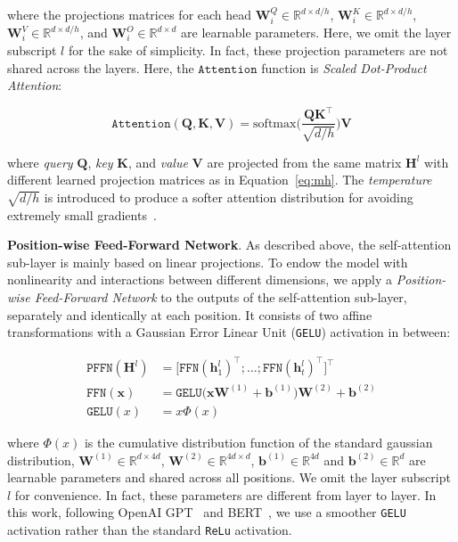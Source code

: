  
where the projections matrices for each head $\bm{W}_i^Q \in \mathbb{R}^{d \times d/h}$, $\bm{W}_i^K \in \mathbb{R}^{d \times d/h}$, $\bm{W}_i^V \in \mathbb{R}^{d \times d/h}$, and $\bm{W}_i^O \in \mathbb{R}^{d \times d}$ are learnable parameters. Here, we omit the layer subscript $l$ for the sake of simplicity. In fact, these projection parameters are not shared across the layers. Here, the $\mathtt{Attention}$ function is \textit{Scaled Dot-Product Attention}:

\begin{equation}
    \mathtt{Attention}(\bm{Q}, \bm{K}, \bm{V}) = \mathrm{softmax} \biggl(\frac{\bm{Q}\bm{K}^{\top}}{\sqrt{d/h}}\biggr) \bm{V}
    \label{eq:scale_dot}
\end{equation}

where \textit{query} $\bm{Q}$, \textit{key} $\bm{K}$, and \textit{value} $\bm{V}$ are projected from the same matrix $\bm{H}^l$ with different learned projection matrices as in Equation~\ref{eq:mh}. 
The \textit{temperature} $\sqrt{d/h}$ is introduced to produce a softer attention distribution for avoiding extremely small gradients~\cite{Hinton:nips2014:Distilling,Vaswani:nips2017:Attention}.

\textbf{Position-wise Feed-Forward Network}. As described above, the self-attention sub-layer is mainly based on linear projections. To endow the model with nonlinearity and interactions between different dimensions, we apply a \textit{Position-wise Feed-Forward Network} to the outputs of the self-attention sub-layer, separately and identically at each position. It consists of two affine transformations with a Gaussian Error Linear Unit (\texttt{GELU}) activation in between:

\begin{equation}
    \begin{aligned}
      \texttt{PFFN}(\bm{H}^l) & = \bigl[\mathtt{FFN}(\bm{h}_1^{l})^{\top}; \dots; \mathtt{FFN}(\bm{h}_t^{l})^{\top}\bigr]^{\top}\\
       \mathtt{FFN}(\bm{x}) &= \texttt{GELU}\bigl(\bm{x} \bm{W}^{(1)}+\bm{b}^{(1)}\bigr)\bm{W}^{(2)} + \bm{b}^{(2)}\\
       \texttt{GELU}(x) &= x \Phi(x)
    \end{aligned}
    \label{eq:ffn}
\end{equation}

where $\Phi(x)$ is the cumulative distribution function of the standard gaussian distribution, $\bm{W}^{(1)}\in \mathbb{R}^{d\times 4d}$, $\bm{W}^{(2)}\in \mathbb{R}^{4d\times d}$, $\bm{b}^{(1)}\in \mathbb{R}^{4d}$ and $\bm{b}^{(2)}\in \mathbb{R}^{d}$ are learnable parameters and shared across all positions. We omit the layer subscript $l$ for convenience. In fact, these parameters are different from layer to layer. In this work, following OpenAI GPT~\cite{Radford:2018:GPT} and BERT~\cite{Devlin:2018:BERT}, we use a smoother \texttt{GELU}~\cite{Hendrycks:gleu} activation rather than the standard \texttt{ReLu} activation. 

